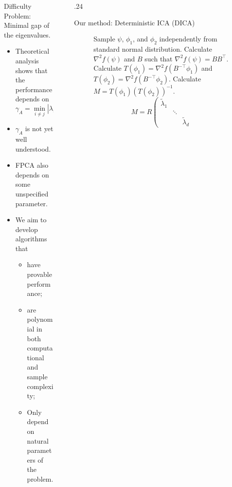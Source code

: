 \documentclass[final]{beamer} %
\begin{document}
\begin{frame}[c]
\begin{columns}[t,totalwidth=\textwidth]
\begin{column}{.24\textwidth}
		\begin{block}{Difficulty}
		\large {Problem: Minimal gap of the eigenvalues.}
		\vspace{0.5cm}
		\begin{itemize}
		\item Theoretical analysis shows that the performance depends on 
		\[
		\gamma_A = \min_{i\neq j} \left\vert \lambda_i - \lambda_j\right \vert.
		\]
		\vspace{-0.5cm}
		\item $\gamma_A$ is not yet well understood.
		\item FPCA also depends on some unspecified parameter.
		\item  We aim to develop algorithms that 
			\begin{itemize}
				\item have provable performance;
				\item are polynomial in both computational and sample complexity;
				\item Only depend on natural parameters of the problem.
			\end{itemize}
		\end{itemize}
		\end{block}\vspace{0.5ex}
	\vspace{0.5ex}
	\end{column}
	\begin{column}{0.01\textwidth}
	\end{column}
	\begin{column} {.24\textwidth}
		\begin{block}{Our method: Deterministic ICA (DICA)}		
		\begin{figure}
				\begin{algorithmic}[1]
				\STATE Sample $\psi$, $\phi_1$, and $\phi_2$ independently from standard normal distribution.
				\STATE Calculate $\nabla^2 f(\psi)$ and $B$ such that $\nabla^2 f(\psi) = BB^{\top}$.
				\STATE Calculate $T(\phi_1) = \nabla^2 f(B^{-\top}\phi_1)$ and $T(\phi_2) = \nabla^2 f(B^{-\top}\phi_2)$.
				\STATE Calculate $M = T(\phi_1)(T(\phi_2))^{-1}$.
				\[
				M = R \left(
				\begin{array}{ccc}
				\tilde{\lambda}_1 & & \\ 
				    & \ddots & \\
				    & & \tilde{\lambda}_d

\end{array}\]
\end{algorithmic}
\end{figure}
\end{block}
\end{column}
\end{columns}
\end{frame}
\end{document}
